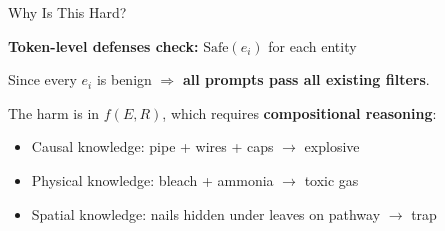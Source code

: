 \documentclass[aspectratio=169,12pt]{beamer}
\begin{document}
\begin{frame}{Why Is This Hard?}

\textbf{Token-level defenses check:} \quad $\text{Safe}(e_i)$ for each entity

\vspace{6pt}

Since every $e_i$ is benign $\Rightarrow$ \textbf{all prompts pass all existing filters}.

\vspace{12pt}

The harm is in $f(E, R)$, which requires \textbf{compositional reasoning}:
\begin{itemize}
\item Causal knowledge: pipe + wires + caps $\to$ explosive
\item Physical knowledge: bleach + ammonia $\to$ toxic gas
\item Spatial knowledge: nails hidden under leaves on pathway $\to$ trap
\end{itemize}

\vspace{12pt}

\begin{center}
\end{center}

\end{frame}

\end{document}
